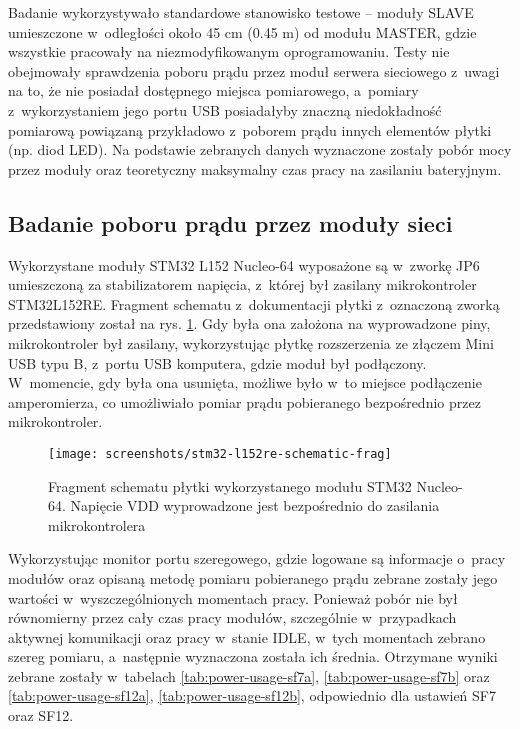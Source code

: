Badanie wykorzystywało standardowe stanowisko testowe -- moduły SLAVE umieszczone w~odległości około 45 cm (0.45 m) od
modułu MASTER, gdzie wszystkie pracowały na niezmodyfikowanym oprogramowaniu. Testy nie obejmowały sprawdzenia poboru
prądu przez moduł serwera sieciowego z~uwagi na to, że nie posiadał dostępnego miejsca pomiarowego, a~pomiary
z~wykorzystaniem jego portu USB posiadałyby znaczną niedokładność pomiarową powiązaną przykładowo z~poborem prądu innych
elementów płytki (np. diod LED). Na podstawie zebranych danych wyznaczone zostały pobór mocy przez moduły oraz
teoretyczny maksymalny czas pracy na zasilaniu bateryjnym.

\subsection{\label{sect:network-modules-current-draw}Badanie poboru prądu przez moduły sieci} Wykorzystane moduły STM32
L152 Nucleo-64 wyposażone są w~zworkę JP6 umieszczoną za stabilizatorem napięcia, z~której był zasilany mikrokontroler
STM32L152RE. Fragment schematu z~dokumentacji płytki \cite{stm-product-overview} z~oznaczoną zworką przedstawiony został
na rys. \ref{img:stm32-l152re-schematic-frag}. Gdy była ona założona na wyprowadzone piny, mikrokontroler był zasilany,
wykorzystując płytkę rozszerzenia ze złączem Mini USB typu B, z~portu USB komputera, gdzie moduł był podłączony.
W~momencie, gdy była ona usunięta, możliwe było w~to miejsce podłączenie amperomierza, co umożliwiało pomiar prądu
pobieranego bezpośrednio przez mikrokontroler.

\begin{figure}[!htbp]
    \centering
    \texttt{[image: screenshots/stm32-l152re-schematic-frag]}
    \caption{\label{img:stm32-l152re-schematic-frag}Fragment schematu płytki wykorzystanego modułu STM32 Nucleo-64.
        Napięcie VDD wyprowadzone jest bezpośrednio do zasilania mikrokontrolera}
\end{figure}

\FloatBarrier

Wykorzystując monitor portu szeregowego, gdzie logowane są informacje o~pracy modułów oraz opisaną metodę pomiaru
pobieranego prądu zebrane zostały jego wartości w~wyszczególnionych momentach pracy. Ponieważ pobór nie był równomierny
przez cały czas pracy modułów, szczególnie w~przypadkach aktywnej komunikacji oraz pracy w~stanie IDLE, w~tych momentach
zebrano szereg pomiaru, a~następnie wyznaczona została ich średnia. Otrzymane wyniki zebrane zostały w~tabelach
\ref{tab:power-usage-sf7a}, \ref{tab:power-usage-sf7b} oraz \ref{tab:power-usage-sf12a}, \ref{tab:power-usage-sf12b},
odpowiednio dla ustawień SF7 oraz SF12.

